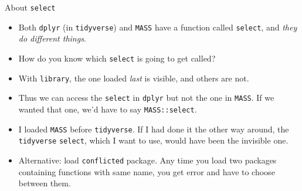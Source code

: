 \documentclass[
  ignorenonframetext,
]{beamer}
\begin{document}
\begin{frame}[fragile]{About \texttt{select}}
\protect\hypertarget{about-select}{}

\begin{itemize}
\item
  Both \texttt{dplyr} (in \texttt{tidyverse}) and \texttt{MASS} have a
  function called \texttt{select}, and \emph{they do
  different things}.
\item
  How do you know which \texttt{select} is going to get called?
\item
  With \texttt{library}, the one loaded \emph{last} is visible, and
  others are not.
\item
  Thus we can access the \texttt{select} in \texttt{dplyr} but not the
  one in \texttt{MASS}. If we wanted that one, we'd have to say
  \texttt{MASS::select}.
\item
  I loaded \texttt{MASS} before \texttt{tidyverse}. If I had done it the
  other way around, the \texttt{tidyverse} \texttt{select}, which I want
  to use, would have been the invisible one.
\item
  Alternative: load \texttt{conflicted} package. Any time you load two
  packages containing functions with same name, you get error and have
  to choose between them.
\end{itemize}

\end{frame}
\end{document}
